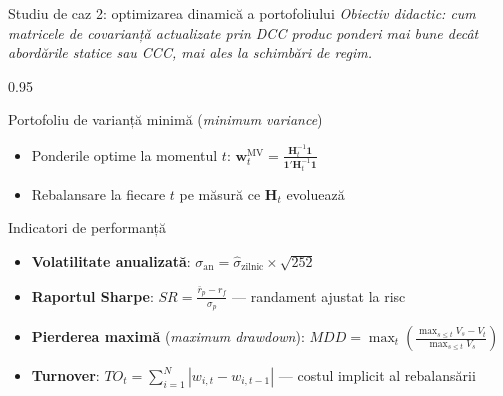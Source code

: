 \documentclass[9pt, aspectratio=169, t]{beamer}
\begin{document}
\begin{frame}{Studiu de caz 2: optimizarea dinamică a portofoliului}
    \vspace{-2mm}
    {\scriptsize\textit{Obiectiv didactic: cum matricele de covarianță actualizate prin DCC produc ponderi mai bune decât abordările statice sau CCC, mai ales la schimbări de regim.}}\vspace{1mm}
    \begin{cminipage}{0.95\textwidth}
    {\footnotesize
    \begin{block}{Portofoliu de varianță minimă (\textit{minimum variance})}
        \begin{itemize}\setlength{\itemsep}{0pt}
            \item Ponderile optime la momentul $t$: $\mathbf{w}_t^{\text{MV}} = \frac{\mathbf{H}_t^{-1}\mathbf{1}}{\mathbf{1}'\mathbf{H}_t^{-1}\mathbf{1}}$
            \item Rebalansare la fiecare $t$ pe măsură ce $\mathbf{H}_t$ evoluează
        \end{itemize}
    \end{block}
    \begin{block}{Indicatori de performanță}
        \begin{itemize}\setlength{\itemsep}{0pt}
            \item \textbf{Volatilitate anualizată}: $\sigma_{\text{an}} = \hat\sigma_{\text{zilnic}} \times \sqrt{252}$
            \item \textbf{Raportul Sharpe}: $SR = \frac{\bar{r}_p - r_f}{\sigma_p}$ --- randament ajustat la risc
            \item \textbf{Pierderea maximă} (\textit{maximum drawdown}): $MDD = \max_{t}\left(\frac{\max_{s \leq t} V_s - V_t}{\max_{s \leq t} V_s}\right)$
            \item \textbf{Turnover}: $TO_t = \sum_{i=1}^{N}|w_{i,t} - w_{i,t-1}|$ --- costul implicit al rebalansării
        \end{itemize}
    \end{block}
    }
    \end{cminipage}
\end{frame}
\end{document}
